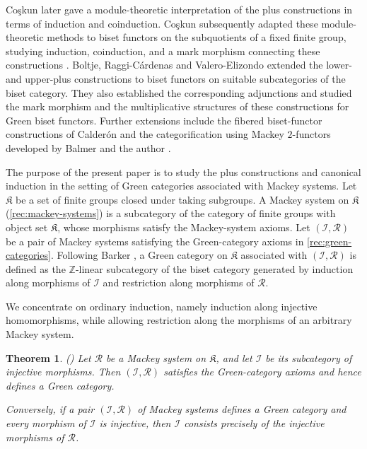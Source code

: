 \documentclass{amsart}
\numberwithin{equation}{section}%
\newtheorem{Thm}[equation]{Theorem}
\theoremstyle{remark}
\theoremstyle{definition}
\begin{document}
Co\c{s}kun \cite{Coskun07} later gave a
module-theoretic interpretation of the plus constructions in terms
of induction and coinduction. Co\c{s}kun subsequently adapted these 
module-theoretic methods to biset functors on the subquotients of a 
fixed finite group, studying induction, coinduction, and 
a mark morphism connecting these constructions \cite{Coskun08}.
Boltje, Raggi-C\'ardenas and Valero-Elizondo
\cite{BoltjeRaggiCardenasValeroElizondo19}
extended the lower- and upper-plus constructions to biset
functors on suitable subcategories of the biset category.
They also established the corresponding adjunctions and
studied the mark morphism and the multiplicative structures
of these constructions for Green biset functors. Further
extensions include the fibered biset-functor constructions of
Calder\'on \cite{Calderon25} and the categorification using Mackey
$2$-functors developed by Balmer and the author
\cite{BalmerMutlu57pp}.


The purpose of the present paper is to study the plus constructions
and canonical induction in the setting of Green categories associated
with Mackey systems. Let $\mathfrak K$
be a set of finite groups closed under taking subgroups.
A Mackey system on $\mathfrak K$ (\cref{rec:mackey-systems}) is a subcategory of the category of
finite groups with object set $\mathfrak K$, whose morphisms satisfy
the Mackey-system axioms. Let $(\mathcal I,\mathcal R)$ be a pair of
Mackey systems satisfying the Green-category axioms in \cref{rec:green-categories}.
Following Barker \cite{Barker16b}, a Green category on $\mathfrak K$ associated with 
$(\mathcal I,\mathcal R)$ is defined as the
$\mathbb Z$-linear subcategory of the biset category generated by
induction along morphisms of $\mathcal I$ and restriction along
morphisms of $\mathcal R$.

We concentrate on ordinary induction, namely induction along
injective homomorphisms, while allowing restriction along the
morphisms of an arbitrary Mackey system.

\begin{Thm}()
\label{thm:intro-green-category}
Let $\mathcal R$ be a Mackey system on $\mathfrak K$, and let
$\mathcal I$ be its subcategory of injective morphisms. Then
$(\mathcal I,\mathcal R)$ satisfies the Green-category axioms
and hence defines a Green category.

Conversely, if a pair $(\mathcal I,\mathcal R)$ of Mackey systems
defines a Green category and every morphism of $\mathcal I$
is injective, then $\mathcal I$ consists precisely of the
injective morphisms of $\mathcal R$.
\end{Thm}
\end{document}
